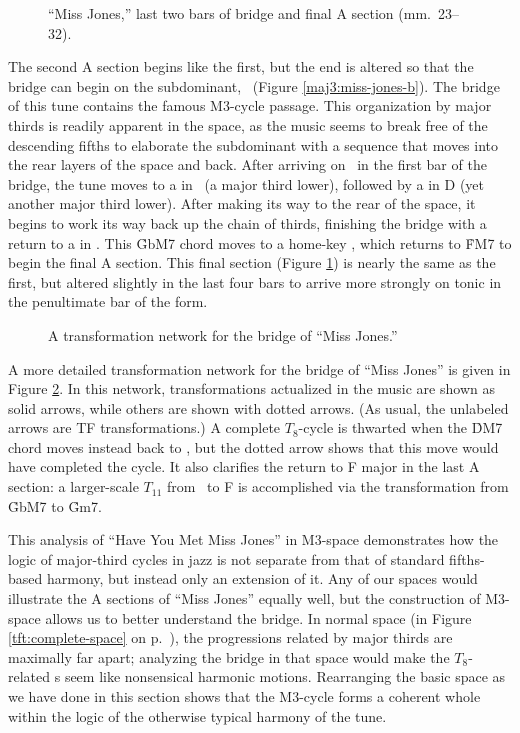 \begin{figure}[tbp]
  \ContinuedFloat
  \caption{``Miss Jones,'' last two bars of bridge and final A section
    (mm.~23--32).}
\label{maj3:miss-jones-c}
\end{figure}

The second A section begins like the first, but the end is altered so that the
bridge can begin on the subdominant, \Bflat\ (Figure \ref{maj3:miss-jones-b}).
The bridge of this tune contains the famous M3-cycle passage. This
organization by major thirds is readily apparent in the space, as the music
seems to break free of the descending fifths to elaborate the subdominant
with a sequence that moves into the rear layers of the space and back. After
arriving on \Bflat\ in the first bar of the bridge, the tune moves to a \tfo
in \Gflat\ (a major third lower), followed by a \tfo in D (yet another major
third lower). After making its way to the rear of the space, it begins to work
its way back up the chain of thirds, finishing the bridge with a return to a
\tfo in \Gflat. This \h{GbM7} chord moves to a home-key \tfo, which returns to
\h{FM7} to begin the final A section. This final section (Figure
\ref{maj3:miss-jones-c}) is nearly the same as the first, but altered slightly
in the last four bars to arrive more strongly on tonic in the penultimate bar
of the form.

\begin{figure}[tbp]
  \caption{A transformation network for the bridge of ``Miss Jones.''}
\label{maj3:miss-jones-bridge}
\end{figure}

A more detailed transformation network for the bridge of ``Miss Jones'' is
given in Figure \ref{maj3:miss-jones-bridge}. In this network,
transformations actualized in the music are shown as solid arrows, while
others are shown with dotted arrows. (As usual, the unlabeled arrows are TF
transformations.) A complete $T_8$-cycle is thwarted when the \h{DM7} chord
moves instead back to \Gflat, but the dotted arrow shows that this move would
have completed the cycle. It also clarifies the return to F major in the last
A section: a larger-scale $T_{11}$ from \Gflat\ to F is accomplished via the
\slideS transformation from \h{GbM7} to \h{Gm7}.

This analysis of ``Have You Met Miss Jones'' in M3-space demonstrates how the
logic of major-third cycles in jazz is not separate from that of standard
fifths-based harmony, but instead only an extension of it. Any of our spaces
would illustrate the A sections of ``Miss Jones'' equally well, but the
construction of M3-space allows us to better understand the bridge. In normal
\tf space (in Figure \ref{tft:complete-space} on
p.~\pageref{tft:complete-space}), the \tfo progressions related by major
thirds are maximally far apart; analyzing the bridge in that space would make
the $T_8$-related \tfo{}s seem like nonsensical harmonic motions. Rearranging
the basic space as we have done in this section shows that the M3-cycle forms
a coherent whole within the logic of the otherwise typical harmony of the
tune.

